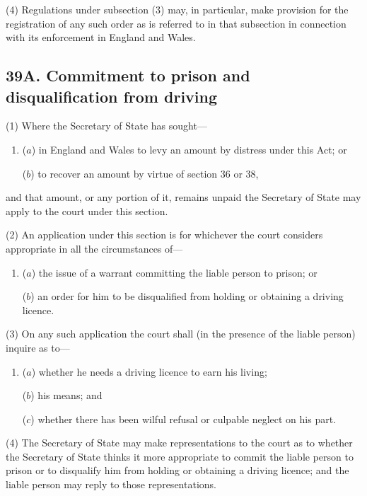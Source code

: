 \documentclass[12pt,a4paper]{article}
\begin{document}
(4) Regulations under subsection (3) may, in particular, make provision for the registration of any such order as is referred to in that subsection in connection with its enforcement in England and Wales.


\subsection{39A. Commitment to prison and disqualification from driving}

(1) Where the Secretary of State has sought---
\begin{enumerate}\item[]
($a$) in England and Wales to levy an amount by distress under this Act; or

($b$) to recover an amount by virtue of section 36 or 38, 
\end{enumerate}
and that amount, or any
portion of it, remains unpaid the Secretary of State may apply to the court
under this section.

(2)
An application under this section is for whichever the court considers appropriate in all the circumstances of---
\begin{enumerate}\item[]
($a$) the issue of a warrant committing the liable person to prison; or

($b$) an order for him to be disqualified from holding or obtaining a driving
licence.
\end{enumerate}

(3)
On any such application the court shall (in the presence of the liable person) inquire as to---
\begin{enumerate}\item[]
($a$) whether he needs a driving licence to earn his living;

($b$) his means; and

($c$) whether there has been wilful refusal or culpable neglect on his part.
\end{enumerate}

(4)
The Secretary of State may make representations to the court as to whether the Secretary of State thinks it more appropriate to commit the liable person to prison or to disqualify him from holding or obtaining a driving licence; and the liable person may reply to those representations.
\end{document}
